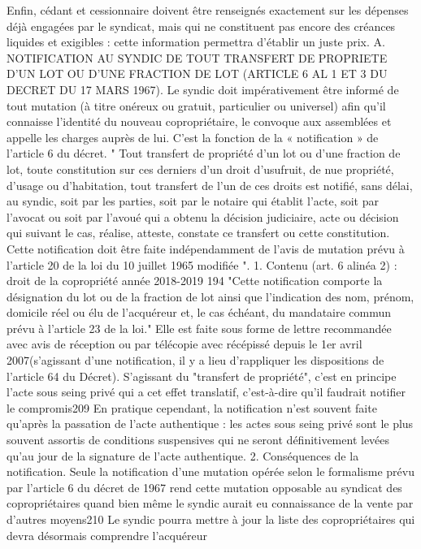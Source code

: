 	Enfin, cédant et cessionnaire doivent être renseignés exactement sur les dépenses déjà engagées par le
	syndicat, mais qui ne constituent pas encore des créances liquides et exigibles : cette information
	permettra d'établir un juste prix.
	A. NOTIFICATION AU SYNDIC DE TOUT TRANSFERT DE PROPRIETE D'UN LOT OU D'UNE
	FRACTION DE LOT (ARTICLE 6 AL 1 ET 3 DU DECRET DU 17 MARS 1967).
	Le syndic doit impérativement être informé de tout mutation (à titre onéreux ou gratuit, particulier ou
	universel) afin qu’il connaisse l'identité du nouveau copropriétaire, le convoque aux assemblées et appelle
	les charges auprès de lui. C’est la fonction de la « notification » de l’article 6 du décret.
	" Tout transfert de propriété d'un lot ou d'une fraction de lot, toute constitution sur ces derniers d'un droit
	d'usufruit, de nue propriété, d'usage ou d'habitation, tout transfert de l'un de ces droits est notifié, sans
	délai, au syndic, soit par les parties, soit par le notaire qui établit l'acte, soit par l'avocat ou soit par l’avoué
	qui a obtenu la décision judiciaire, acte ou décision qui suivant le cas, réalise, atteste, constate ce transfert
	ou cette constitution.
	Cette notification doit être faite indépendamment de l'avis de mutation prévu à l'article 20 de la loi du 10
	juillet 1965 modifiée ".
	1. Contenu (art. 6 alinéa 2) :
	droit de la copropriété année 2018-2019
	194
	"Cette notification comporte la désignation du lot ou de la fraction de lot ainsi que l'indication des nom,
	prénom, domicile réel ou élu de l'acquéreur et, le cas échéant, du mandataire commun prévu à l'article 23
	de la loi."
	Elle est faite sous forme de lettre recommandée avec avis de réception ou par télécopie avec récépissé
	depuis le 1er avril 2007(s’agissant d’une notification, il y a lieu d’rappliquer les dispositions de l’article 64
	du Décret).
	S'agissant du "transfert de propriété", c'est en principe l'acte sous seing privé qui a cet effet translatif,
	c'est-à-dire qu'il faudrait notifier le compromis209 En pratique cependant, la notification n'est souvent faite
	qu'après la passation de l'acte authentique : les actes sous seing privé sont le plus souvent assortis de
	conditions suspensives qui ne seront définitivement levées qu’au jour de la signature de l’acte
	authentique.
	2. Conséquences de la notification.
	Seule la notification d’une mutation opérée selon le formalisme prévu par l’article 6 du décret de 1967
	rend cette mutation opposable au syndicat des copropriétaires quand bien même le syndic aurait eu
	connaissance de la vente par d’autres moyens210
	Le syndic pourra mettre à jour la liste des copropriétaires qui devra désormais comprendre l'acquéreur
